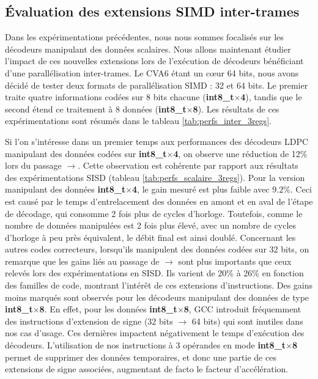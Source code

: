 \documentclass[../main.tex]{subfiles}
\begin{document}
%
%
%
%
%
\subsection{Évaluation des extensions SIMD inter-trames}
%
%
%
%

Dans les expérimentations précédentes, nous nous sommes focalisés sur les décodeurs manipulant des données scalaires. Nous allons maintenant étudier l'impact de ces nouvelles extensions lors de l'exécution de décodeurs bénéficiant d'une parallélisation inter-trames. 
Le CVA6 étant un cœur 64 bits, nous avons décidé de tester deux formats de parallélisation SIMD : 32 et 64 bits. 
Le premier traite quatre informations codées sur 8 bits chacune (\textbf{int8\_t$\times$4}), tandis que le second étend ce traitement à 8 données (\textbf{int8\_t$\times$8}). 
Les résultats de ces expérimentations sont résumés dans le tableau \ref{tab:perfs_inter_3regs}.



Si l'on s'intéresse dans un premier temps aux performances des décodeurs LDPC manipulant des données codées sur \textbf{int8\_t$\times$4}, on observe une réduction de 12\% lors du passage  $\rightarrow$.
Cette observation est cohérente par rapport aux résultats des expérimentations SISD (tableau \ref{tab:perfs_scalaire_3regs}).
Pour la version manipulant des données \textbf{int8\_t$\times$4}, le gain mesuré est plus faible avec $9.2\%$.
Ceci est causé par le temps d'entrelacement des données en amont et en aval de l'étape de décodage, qui consomme 2 fois plus de cycles d'horloge.
Toutefois, comme le nombre de données manipulées est 2 fois plus élevé, avec un nombre de cycles d'horloge à peu près équivalent, le débit final est ainsi doublé.
Concernant les autres codes correcteurs, lorsqu'ils manipulent des données codées sur 32 bits, on remarque que les gains liés au passage de $\rightarrow$ sont plus importants que ceux relevés lors des expérimentations en SISD.
Ils varient de 20\% à 26\% en fonction des familles de code, montrant l'intérêt de ces extensions d'instructions.
Des gains moins marqués sont observés pour les décodeurs manipulant des données de type \textbf{int8\_t$\times$8}.
En effet, pour les données \textbf{int8\_t$\times$8}, GCC introduit fréquemment des instructions d'extension de signe (32 bits $\rightarrow$ 64 bits) qui sont inutiles dans nos cas d'usage.
Ces dernières impactent négativement le temps d'exécution des décodeurs.
L'utilisation de nos instructions à 3 opérandes en mode \textbf{int8\_t$\times$8} permet de supprimer des données temporaires, et donc une partie de ces extensions de signe associées, augmentant de facto le facteur d'accélération.
\end{document}
